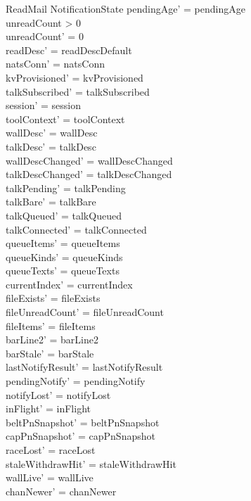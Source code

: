 \documentclass[a4paper,10pt,fleqn]{article}
\begin{document}
\begin{schema}{ReadMail}
  \Delta NotificationState
  \where
  pendingAge' = pendingAge \\
  unreadCount > 0 \\
  unreadCount' = 0 \\
  readDesc' = readDescDefault \\
  natsConn' = natsConn \\
  kvProvisioned' = kvProvisioned \\
  talkSubscribed' = talkSubscribed \\
  session' = session \\
  toolContext' = toolContext \\
  wallDesc' = wallDesc \\
  talkDesc' = talkDesc \\
  wallDescChanged' = wallDescChanged \\
  talkDescChanged' = talkDescChanged \\
  talkPending' = talkPending \\
  talkBare' = talkBare \\
  talkQueued' = talkQueued \\
  talkConnected' = talkConnected \\
  queueItems' = queueItems \\
  queueKinds' = queueKinds \\
  queueTexts' = queueTexts \\
  currentIndex' = currentIndex \\
  fileExists' = fileExists \\
  fileUnreadCount' = fileUnreadCount \\
  fileItems' = fileItems \\
  barLine2' = barLine2 \\
  barStale' = barStale \\
  lastNotifyResult' = lastNotifyResult \\
  pendingNotify' = pendingNotify \\
  notifyLost' = notifyLost \\
  inFlight' = inFlight \\
  beltPnSnapshot' = beltPnSnapshot \\
  capPnSnapshot' = capPnSnapshot \\
  raceLost' = raceLost \\
  staleWithdrawHit' = staleWithdrawHit \\
  wallLive' = wallLive \\
  chanNewer' = chanNewer \\

\end{schema}
\end{document}
